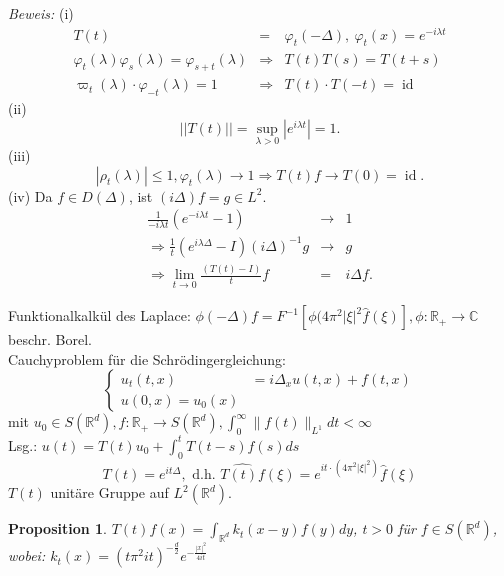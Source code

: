 \documentclass[12pt,a4paper,titlepage]{scrartcl}
\newtheorem{Prop}[Satz]{Proposition}
\DeclareMathOperator{\id}{id}
\numberwithin{equation}{section}
\newcommand{\C}{\mathbb{C}} %
\newcommand{\R}{\mathbb{R}} %
\newcommand{\m}{\cdot}
\newcommand{\Bew}{\emph{Beweis: }}
\newcommand{\laplace}{\Delta}
\begin{document}
	\Bew (i) 
	\begin{eqnarray}
		T(t)&=&\varphi_t(-\laplace),~ \varphi_t(x) = e^{-i\lambda t}\nonumber\\
		\varphi_t(\lambda)\varphi_s(\lambda) = \varphi_{s+t}(\lambda)&\Rightarrow& T(t) T(s) = T(t+s)\nonumber\\
		\varpi_t(\lambda)\m\varphi_{-t}(\lambda)= 1&\Rightarrow& T(t)\m T(-t) = \id\nonumber
	\end{eqnarray}
	(ii) 
	$$||T(t)|| = \sup_{\lambda>0}|e^{i\lambda t}| =1.$$
	(iii)
	$$|\rho_t(\lambda)|\leq 1, \varphi_t(\lambda)\rightarrow 1\Rightarrow T(t)f\rightarrow T(0) =\id.$$
	(iv) Da $f\in D(\laplace)$, ist $(i\laplace)f=g\in L^2$.
	\begin{eqnarray}
		\frac{1}{-i\lambda t}(e^{-i\lambda t}-1)&\rightarrow& 1\nonumber\\
		\Rightarrow \frac{1}{t}(e^{i\lambda\laplace}- I)(i\laplace)^{-1}g&\rightarrow& g\nonumber\\
		\Rightarrow \lim\limits_{t\rightarrow 0}\frac{(T(t)-I)}{t}f &=& i\laplace f.\nonumber
	\end{eqnarray}
	
	Funktionalkalkül des Laplace: $ \phi ( - \laplace )f = F^{-1}[\phi ( 4 \pi^{2} |\xi|^{2} \hat{f}(\xi)], \phi: \R_{+} \rightarrow \C$ beschr. Borel. \\
	Cauchyproblem für die Schrödingergleichung:
		\[ \begin{cases}
			u_{t}(t, x) & = i \laplace_{x} u(t, x ) + f(t, x) \\
			u(0, x) = u_{0}(x)
		\end{cases} \]
	mit $u_{0} \in S(\R^{d}), f \colon \R_{+} \rightarrow S(\R^{d}), \int_{0}^{\infty} \| f(t) \|_{L^{1}} dt < \infty$  \\
	Lsg.: $u(t) = T(t) u_{0} + \int_{0}^{t} T(t - s) f(s) ds$
		\[ T(t) = e^{it\laplace}, \text{ d.h. } \widehat{T(t)f}(\xi) = e^{it \cdot ( 4 \pi^{2} |\xi|^{2} )} \hat{f}(\xi) \]
	$T(t)$ unitäre Gruppe auf $L^{2}(\R^{d})$.


	\setcounter{Satz}{2} %
	\begin{Prop}
		$T(t) f(x) = \int_{\R^{d}} k_{t}(x-y) f(y) dy$, $t > 0$ für $f \in S(\R^{d})$, \\
		wobei: $k_{t}(x) = (t \pi^{2} i t)^{-\frac{d}{2}} e^{- \frac{|x|^{2}}{4 i t}}$ 
	\end{Prop}
	
\end{document}

